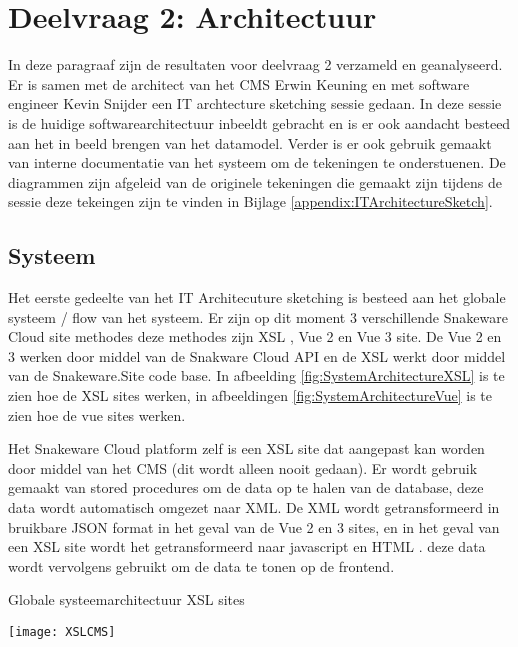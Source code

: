 \section{Deelvraag 2: Architectuur}
In deze paragraaf zijn de resultaten voor deelvraag 2 \textit{\SubquestionTwo} verzameld en geanalyseerd.
Er is samen met de architect van het CMS Erwin Keuning en met software engineer Kevin Snijder een IT archtecture sketching sessie gedaan.
In deze sessie is de huidige softwarearchitectuur inbeeldt gebracht en is er ook aandacht besteed aan het in beeld brengen van het datamodel.
Verder is er ook gebruik gemaakt van interne documentatie van het systeem om de tekeningen te onderstuenen.
De diagrammen zijn afgeleid van de originele tekeningen die gemaakt zijn tijdens de sessie deze tekeingen zijn te vinden in Bijlage \ref{appendix:ITArchitectureSketch}.


\subsection{Systeem}
Het eerste gedeelte van het IT Architecuture sketching is besteed aan het globale systeem / flow van het systeem.
Er zijn op dit moment 3 verschillende Snakeware Cloud site methodes deze methodes zijn XSL \Parencite{XSL}, Vue 2 en Vue 3 \Parencite{Vue} site.
De Vue 2 en 3 werken door middel van de Snakware Cloud API en de XSL werkt door middel van de Snakeware.Site code base.
In afbeelding \ref{fig:SystemArchitectureXSL} is te zien hoe de XSL sites werken, in afbeeldingen \ref{fig:SystemArchitectureVue} is te zien hoe de vue sites werken.

\whitespace
Het Snakeware Cloud platform zelf is een XSL site dat aangepast kan worden door middel van het CMS (dit wordt alleen nooit gedaan).
Er wordt gebruik gemaakt van stored procedures om de data op te halen van de database, deze data wordt automatisch omgezet naar XML.
De XML wordt getransformeerd in bruikbare JSON format \Parencite{JSON} in het geval van de Vue 2 en 3 sites, en in het geval van een XSL site wordt het getransformeerd naar javascript en HTML \Parencite{HTML}.
deze data wordt vervolgens gebruikt om de data te tonen op de frontend.

\whitespace
\begin{graphic}
	\captionsetup{type=figure}
	\caption{Globale systeemarchitectuur XSL sites}
	\texttt{[image: XSLCMS]}
	\label{fig:SystemArchitectureXSL}
\end{graphic}

